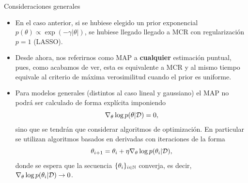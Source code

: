 \documentclass[9pt, handout]{beamer}
\begin{document}
\begin{frame}{Consideraciones generales}

\begin{itemize}
	\item En el caso anterior, si se hubiese elegido un prior exponencial $p(\theta)\propto\exp(-\gamma|\theta|)$, se hubiese llegado llegado a MCR con regularización $p=1$ (LASSO).\pause
	\item Desde ahora, nos referirnos como MAP a \textbf{cualquier} estimación puntual, pues, como acabamos de ver, esta es equivalente a MCR y al mismo tiempo equivale al criterio de máxima verosimilitud cuando el prior es uniforme.\pause
	\item Para modelos generales (distintos al caso lineal y gaussiano) el MAP no podrá ser calculado de forma explícita imponiendo 
\begin{equation*}
 	\nabla_\theta  \log p(\theta|{\mathcal D}) = 0,
 \end{equation*}
 sino que se tendrán que considerar algoritmos de optimización. En particular se utilizan algoritmos basados en derivadas con iteraciones de la forma
 \begin{equation*}
 	\theta_{i+1} = \theta_i + \eta \nabla_\theta  \log p(\theta_i|{\mathcal D}), \label{eq:itera_MAP_grad}
 \end{equation*}
 donde se espera que la secuencia $\{\theta_i\}_{i\in{\mathbb N}}$ converja, es decir, $\nabla_\theta  \log p(\theta_i|{\mathcal D}) \to 0$.
\end{itemize}

\end{frame}
\end{document}
